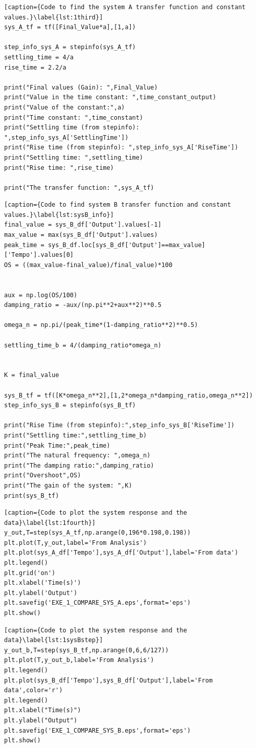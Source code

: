 \documentclass[a4paper]{article}
\begin{document}
\begin{lstlisting}[caption={Code to find the system A transfer function and constant values.}\label{lst:1third}]
sys_A_tf = tf([Final_Value*a],[1,a])

step_info_sys_A = stepinfo(sys_A_tf)
settling_time = 4/a
rise_time = 2.2/a 

print("Final values (Gain): ",Final_Value)
print("Value in the time constant: ",time_constant_output)
print("Value of the constant:",a)
print("Time constant: ",time_constant)
print("Settling time (from stepinfo): ",step_info_sys_A['SettlingTime'])
print("Rise time (from stepinfo): ",step_info_sys_A['RiseTime'])
print("Settling time: ",settling_time)
print("Rise time: ",rise_time)

print("The transfer function: ",sys_A_tf)
\end{lstlisting}
\begin{lstlisting}[caption={Code to find system B transfer function and constant values.}\label{lst:sysB_info}]
final_value = sys_B_df['Output'].values[-1]
max_value = max(sys_B_df['Output'].values)
peak_time = sys_B_df.loc[sys_B_df['Output']==max_value]['Tempo'].values[0]
OS = ((max_value-final_value)/final_value)*100


aux = np.log(OS/100)
damping_ratio = -aux/(np.pi**2+aux**2)**0.5

omega_n = np.pi/(peak_time*(1-damping_ratio**2)**0.5)

settling_time_b = 4/(damping_ratio*omega_n)


K = final_value

sys_B_tf = tf([K*omega_n**2],[1,2*omega_n*damping_ratio,omega_n**2])
step_info_sys_B = stepinfo(sys_B_tf)

print("Rise Time (from stepinfo):",step_info_sys_B['RiseTime'])
print("Settling time:",settling_time_b)
print("Peak Time:",peak_time)
print("The natural frequency: ",omega_n)
print("The damping ratio:",damping_ratio)
print("Overshoot",OS)
print("The gain of the system: ",K)
print(sys_B_tf)
\end{lstlisting}
\begin{lstlisting}[caption={Code to plot the system response and the data}\label{lst:1fourth}]
y_out,T=step(sys_A_tf,np.arange(0,196*0.198,0.198))
plt.plot(T,y_out,label='From Analysis')
plt.plot(sys_A_df['Tempo'],sys_A_df['Output'],label='From data')
plt.legend()
plt.grid('on')
plt.xlabel('Time(s)')
plt.ylabel('Output')
plt.savefig('EXE_1_COMPARE_SYS_A.eps',format='eps')
plt.show()
\end{lstlisting}
\begin{lstlisting}[caption={Code to plot the system response and the data}\label{lst:1sysBstep}]
y_out_b,T=step(sys_B_tf,np.arange(0,6,6/127))
plt.plot(T,y_out_b,label='From Analysis')
plt.legend()
plt.plot(sys_B_df['Tempo'],sys_B_df['Output'],label='From data',color='r')
plt.legend()
plt.xlabel("Time(s)")
plt.ylabel("Output")
plt.savefig('EXE_1_COMPARE_SYS_B.eps',format='eps')
plt.show()
\end{lstlisting}
\end{document}
